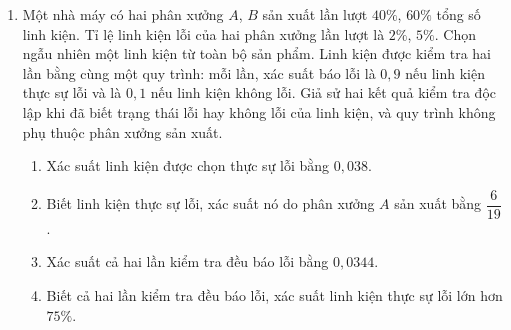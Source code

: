 \documentclass[12pt,a4paper]{article}
\begin{document}
\begin{enumerate}
\item Một nhà máy có hai phân xưởng $A$, $B$ sản xuất lần lượt $40\%$, $60\%$ tổng số linh kiện. Tỉ lệ linh kiện lỗi của hai phân xưởng lần lượt là $2\%$, $5\%$. Chọn ngẫu nhiên một linh kiện từ toàn bộ sản phẩm. Linh kiện được kiểm tra hai lần bằng cùng một quy trình: mỗi lần, xác suất báo lỗi là $0{,}9$ nếu linh kiện thực sự lỗi và là $0{,}1$ nếu linh kiện không lỗi. Giả sử hai kết quả kiểm tra độc lập khi đã biết trạng thái lỗi hay không lỗi của linh kiện, và quy trình không phụ thuộc phân xưởng sản xuất.
\begin{enumerate}[label=\alph*)]
\item Xác suất linh kiện được chọn thực sự lỗi bằng $0{,}038$.
\item Biết linh kiện thực sự lỗi, xác suất nó do phân xưởng $A$ sản xuất bằng $\dfrac{6}{19}$.
\item Xác suất cả hai lần kiểm tra đều báo lỗi bằng $0{,}0344$.
\item Biết cả hai lần kiểm tra đều báo lỗi, xác suất linh kiện thực sự lỗi lớn hơn $75\%$.
\end{enumerate}


\end{enumerate}
\end{document}

